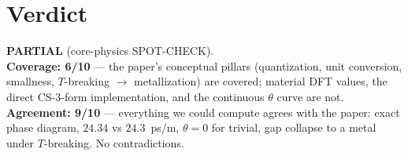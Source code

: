 \documentclass[11pt]{article}
\begin{document}
\section{Verdict}
\textbf{PARTIAL} (core-physics SPOT-CHECK). \\
\textbf{Coverage: 6/10} --- the paper's conceptual pillars (quantization,
unit conversion, smallness, $T$-breaking $\to$ metallization) are covered;
material DFT values, the direct CS-3-form implementation, and the
continuous $\theta$ curve are not.\\
\textbf{Agreement: 9/10} --- everything we could compute agrees with the
paper: exact phase diagram, $24.34$ vs $24.3$~ps/m, $\theta=0$ for trivial,
gap collapse to a metal under $T$-breaking. No contradictions.
\end{document}
